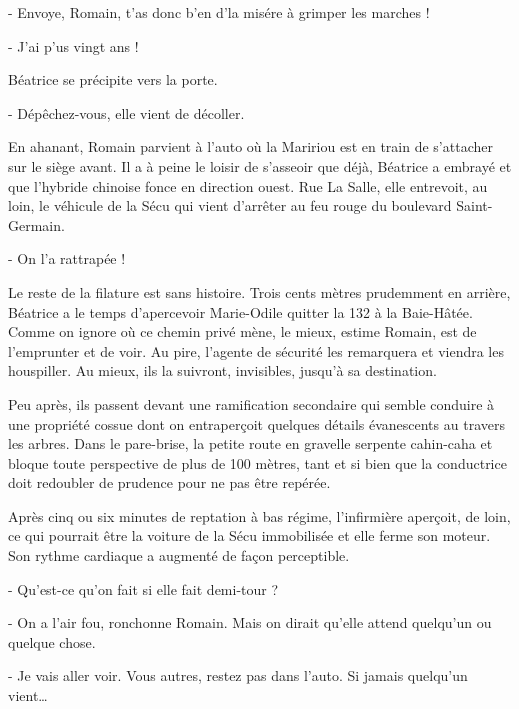- Envoye, Romain, t’as donc b’en d’la misére à grimper les marches !

- J’ai p’us vingt ans !

Béatrice se précipite vers la porte.

- Dépêchez-vous, elle vient de décoller.

En ahanant, Romain parvient à l’auto où la Maririou est en train de s’attacher sur le siège avant. Il a à peine le loisir de s’asseoir que déjà, Béatrice a embrayé et que l’hybride chinoise fonce en direction ouest. Rue La Salle, elle entrevoit, au loin, le véhicule de la Sécu qui vient d’arrêter au feu rouge du boulevard Saint-Germain.

- On l’a rattrapée !

Le reste de la filature est sans histoire. Trois cents mètres prudemment en arrière, Béatrice a le temps d’apercevoir Marie-Odile quitter la 132 à la Baie-Hâtée. Comme on ignore où ce chemin privé mène, le mieux, estime Romain, est de l’emprunter et de voir. Au pire, l’agente de sécurité les remarquera et viendra les houspiller. Au mieux, ils la suivront, invisibles, jusqu’à sa destination.

Peu après, ils passent devant une ramification secondaire qui semble conduire à une propriété cossue dont on entraperçoit quelques détails évanescents au travers les arbres. Dans le pare-brise, la petite route en gravelle serpente cahin-caha et bloque toute perspective de plus de 100 mètres, tant et si bien que la conductrice doit redoubler de prudence pour ne pas être repérée.

Après cinq ou six minutes de reptation à bas régime, l’infirmière aperçoit, de loin, ce qui pourrait être la voiture de la Sécu immobilisée et elle ferme son moteur. Son rythme cardiaque a augmenté de façon perceptible.

- Qu’est-ce qu’on fait si elle fait demi-tour ?

- On a l’air fou, ronchonne Romain. Mais on dirait qu’elle attend quelqu’un ou quelque chose.

- Je vais aller voir. Vous autres, restez pas dans l’auto. Si jamais quelqu’un vient…


